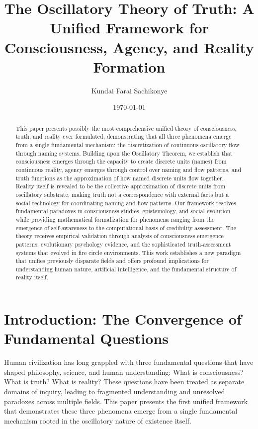\documentclass[12pt]{article}
\title{The Oscillatory Theory of Truth: A Unified Framework for Consciousness, Agency, and Reality Formation}
\author{Kundai Farai Sachikonye}
\date{\today}
\begin{document}
\maketitle

\begin{abstract}
This paper presents possibly the most comprehensive unified theory of consciousness, truth, and reality ever formulated, demonstrating that all three phenomena emerge from a single fundamental mechanism: the discretization of continuous oscillatory flow through naming systems. Building upon the Oscillatory Theorem, we establish that consciousness emerges through the capacity to create discrete units (names) from continuous reality, agency emerges through control over naming and flow patterns, and truth functions as the approximation of how named discrete units flow together. Reality itself is revealed to be the collective approximation of discrete units from oscillatory substrate, making truth not a correspondence with external facts but a social technology for coordinating naming and flow patterns. Our framework resolves fundamental paradoxes in consciousness studies, epistemology, and social evolution while providing mathematical formalization for phenomena ranging from the emergence of self-awareness to the computational basis of credibility assessment. The theory receives empirical validation through analysis of consciousness emergence patterns, evolutionary psychology evidence, and the sophisticated truth-assessment systems that evolved in fire circle environments. This work establishes a new paradigm that unifies previously disparate fields and offers profound implications for understanding human nature, artificial intelligence, and the fundamental structure of reality itself.
\end{abstract}

\section{Introduction: The Convergence of Fundamental Questions}

Human civilization has long grappled with three fundamental questions that have shaped philosophy, science, and human understanding: What is consciousness? What is truth? What is reality? These questions have been treated as separate domains of inquiry, leading to fragmented understanding and unresolved paradoxes across multiple fields. This paper presents the first unified framework that demonstrates these three phenomena emerge from a single fundamental mechanism rooted in the oscillatory nature of existence itself.
\end{document}
